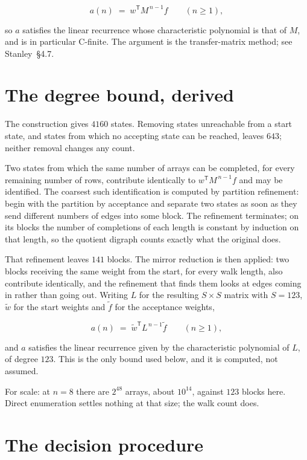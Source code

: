 \documentclass[11pt]{article}
\theoremstyle{definition}
\begin{document}
\[a(n) \;=\; w^{\mathsf T} M^{\,n-1} f \qquad (n \ge 1),\]

so $a$ satisfies the linear recurrence whose characteristic polynomial is that of $M$, and is in particular C-finite. The argument is the transfer-matrix method; see Stanley~\S4.7.

\section{The degree bound, derived}

The construction gives $4160$ states. Removing states unreachable from a start state, and states from which no accepting state can be reached, leaves $643$; neither removal changes any count.

Two states from which the same number of arrays can be completed, for every remaining number of rows, contribute identically to $w^{\mathsf T}M^{\,n-1}f$ and may be identified. The coarsest such identification is computed by partition refinement: begin with the partition by acceptance and separate two states as soon as they send different numbers of edges into some block. The refinement terminates; on its blocks the number of completions of each length is constant by induction on that length, so the quotient digraph counts exactly what the original does.

That refinement leaves $141$ blocks. The mirror reduction is then applied: two blocks receiving the same weight from the start, for every walk length, also contribute identically, and the refinement that finds them looks at edges coming in rather than going out. Writing $L$ for the resulting $S \times S$ matrix with $S = 123$, $\tilde w$ for the start weights and $\tilde f$ for the acceptance weights,

\[a(n) \;=\; \tilde w^{\mathsf T} L^{\,n-1} \tilde f \qquad (n \ge 1),\]

and $a$ satisfies the linear recurrence given by the characteristic polynomial of $L$, of degree $123$. This is the only bound used below, and it is computed, not assumed.

For scale: at $n = 8$ there are $2^{48}$ arrays, about $10^{14}$, against $123$ blocks here. Direct enumeration settles nothing at that size; the walk count does.

\section{The decision procedure}
\end{document}
